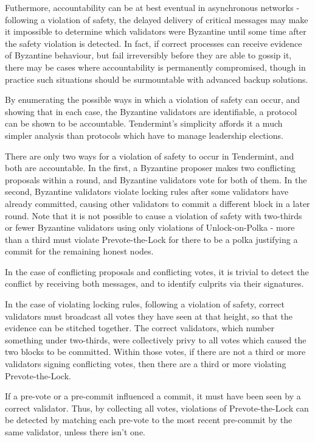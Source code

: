 Futhermore, accountability can be at best eventual in asynchronous networks - 
following a violation of safety, the delayed delivery of critical messages
may make it impossible to determine which validators were Byzantine until some time after
the safety violation is detected. 
In fact, if correct processes can receive evidence of Byzantine behaviour, 
but fail irreversibly before they are able to gossip it, 
there may be cases where accountability is permanently compromised,
though in practice such situations should be surmountable
with advanced backup solutions.

By enumerating the possible ways in which a violation of safety can occur,
and showing that in each case, the Byzantine validators are identifiable,
a protocol can be shown to be accountable.
Tendermint's simplicity affords it a much simpler analysis than protocols 
which have to manage leadership elections.

There are only two ways for a violation of safety to occur in Tendermint,
and both are accountable.
In the first, a Byzantine proposer makes two conflicting proposals within a round,
and Byzantine validators vote for both of them.
In the second, Byzantine validators violate locking rules after some validators have already committed,
causing other validators to commit a different block in a later round.
Note that it is not possible to cause a violation of safety with two-thirds or fewer
Byzantine validators using only violations of Unlock-on-Polka - 
more than a third must violate Prevote-the-Lock for there to be a polka justifying a commit 
for the remaining honest nodes.

In the case of conflicting proposals and conflicting votes,
it is trivial to detect the conflict by receiving both messages,
and to identify culprits via their signatures.

In the case of violating locking rules, following a violation of safety,
correct validators must broadcast all votes they have seen at that height, 
so that the evidence can be stitched together.
The correct validators, which number something under two-thirds, 
were collectively privy to all votes which caused the two blocks to be committed.
Within those votes, if there are not a third or more validators signing conflicting votes,
then there are a third or more violating Prevote-the-Lock.

If a pre-vote or a pre-commit influenced a commit, it must have been seen by a correct validator.
Thus, by collecting all votes, violations of Prevote-the-Lock can be detected
by matching each pre-vote to the most recent pre-commit by the same validator, unless there isn't one.

